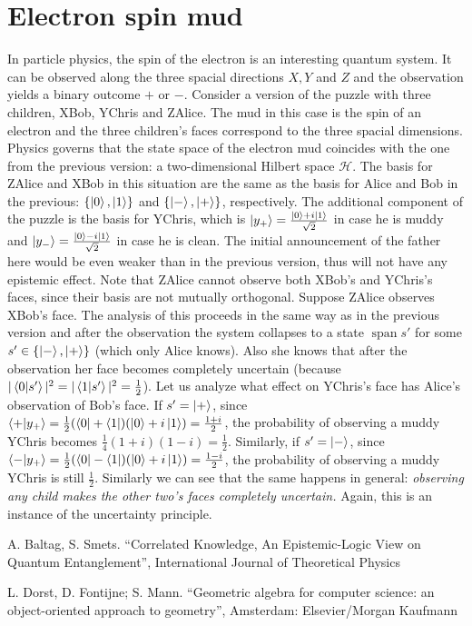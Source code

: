 \documentclass[a4paper]{article}
\newcommand{\HH}{\mathcal{H}}
\DeclareMathOperator{\spn}{span}
\begin{document}
\section*{Electron spin mud}
In particle physics, the spin of the electron is an interesting quantum system.
It can be observed along the three spacial directions $X, Y$ and $Z$ and the
observation yields a binary outcome $+$ or $-$. Consider a version of the puzzle
with three children, XBob, YChris and ZAlice. The mud in this case is the spin
of an electron and the three children's faces correspond to the three spacial
dimensions. Physics governs that the state space of the electron mud coincides
with the one from the previous version: a two-dimensional Hilbert space $\HH$.
The basis for ZAlice and XBob in this situation are the same as the basis for
Alice and Bob in the previous: $\{\ket{0},\ket{1}\}$ and $\{\ket{-},\ket{+}\}$,
respectively. The additional component of the puzzle is the basis for YChris,
which is $\ket{y_+} = \frac{\ket{0}+i\ket{1}}{\sqrt{2}}$ in case he is muddy and
$\ket{y_-} = \frac{\ket{0}-i\ket{1}}{\sqrt{2}}$ in case he is clean. The initial
announcement of the father here would be even weaker than in the previous
version, thus will not have any epistemic effect. Note that ZAlice cannot
observe both XBob's and YChris's faces, since their basis are not mutually
orthogonal. Suppose ZAlice observes XBob's face. The analysis of this proceeds
in the same way as in the previous version and after the observation the system
collapses to a state $\spn s'$ for some $s' \in \{\ket{-},\ket{+}\}$ (which only
Alice knows). Also she knows that after the observation her face becomes
completely uncertain (because $|\braket{0|s'}|^2 = |\braket{1|s'}|^2 =
\frac{1}{2}$). Let us analyze what effect on YChris's face has Alice's
observation of Bob's face. If $s' = \ket{+}$, since 
$\braket{+|y_+} = \frac{1}{2}(\bra{0} + \bra{1})(\ket{0} + i\ket{1}) =
\frac{1+i}{2}$, the probability of observing a muddy YChris becomes
$\frac{1}{4}(1+i)(1-i) = \frac{1}{2}$. Similarly, if $s' = \ket{-}$, since
$\braket{-|y_+} = \frac{1}{2}(\bra{0} - \bra{1})(\ket{0} + i\ket{1}) =
\frac{1-i}{2}$, the probability of observing a muddy YChris is still
$\frac{1}{2}$. Similarly we can see that the same happens in general: \emph{
observing any child makes the other two's faces completely uncertain.} Again,
this is an instance of the uncertainty principle.


\begin{thebibliography}{9}
A. Baltag, S. Smets. ``Correlated Knowledge, An Epistemic-Logic View on 
Quantum Entanglement'', International Journal of Theoretical Physics

L. Dorst, D. Fontijne; S. Mann. ``Geometric algebra for computer science: an 
object-oriented approach to geometry'', Amsterdam: Elsevier/Morgan Kaufmann
\end{thebibliography}
\end{document}
